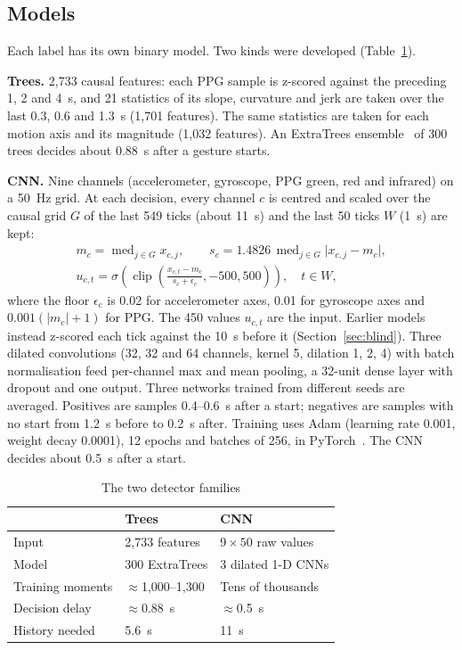 \subsection{Models}

Each label has its own binary model. Two kinds were developed (Table~\ref{tab:models}).

\textbf{Trees.} 2{,}733 causal features: each PPG sample is z-scored against the preceding 1, 2 and 4~s, and 21 statistics of its slope, curvature and jerk are taken over the last 0.3, 0.6 and 1.3~s (1{,}701 features). The same statistics are taken for each motion axis and its magnitude (1{,}032 features). An ExtraTrees ensemble~\cite{geurts2006extra,sklearn} of 300 trees decides about 0.88~s after a gesture starts.

\textbf{CNN.} Nine channels (accelerometer, gyroscope, PPG green, red and infrared) on a 50~Hz grid. At each decision, every channel $c$ is centred and scaled over the causal grid $G$ of the last 549 ticks (about 11~s) and the last 50 ticks $W$ (1~s) are kept:
\begin{gather}
  m_c = \operatorname{med}_{j\in G} x_{c,j}, \qquad s_c = 1.4826\,\operatorname{med}_{j\in G} \lvert x_{c,j} - m_c \rvert, \\
  u_{c,t} = \sigma\!\left(\operatorname{clip}\!\left(\frac{x_{c,t} - m_c}{s_c + \epsilon_c}, -500, 500\right)\right), \quad t \in W,
\end{gather}
where the floor $\epsilon_c$ is 0.02 for accelerometer axes, 0.01 for gyroscope axes and $0.001(\lvert m_c\rvert + 1)$ for PPG. The 450 values $u_{c,t}$ are the input. Earlier models instead z-scored each tick against the 10~s before it (Section~\ref{sec:blind}). Three dilated convolutions (32, 32 and 64 channels, kernel 5, dilation 1, 2, 4) with batch normalisation feed per-channel max and mean pooling, a 32-unit dense layer with dropout and one output. Three networks trained from different seeds are averaged. Positives are samples 0.4--0.6~s after a start; negatives are samples with no start from 1.2~s before to 0.2~s after. Training uses Adam (learning rate 0.001, weight decay 0.0001), 12 epochs and batches of 256, in PyTorch~\cite{pytorch}. The CNN decides about 0.5~s after a start.

\begin{table}[t]
  \centering
  \caption{The two detector families}
  \label{tab:models}
  \small
  \begin{tabular}{@{}lll@{}}
    \toprule
     & Trees & CNN \\
    \midrule
    Input & 2{,}733 features & $9 \times 50$ raw values \\
    Model & 300 ExtraTrees & 3 dilated 1-D CNNs \\
    Training moments & $\approx$1{,}000--1{,}300 & Tens of thousands \\
    Decision delay & $\approx$0.88~s & $\approx$0.5~s \\
    History needed & 5.6~s & 11~s \\
    \bottomrule
  \end{tabular}
\end{table}

